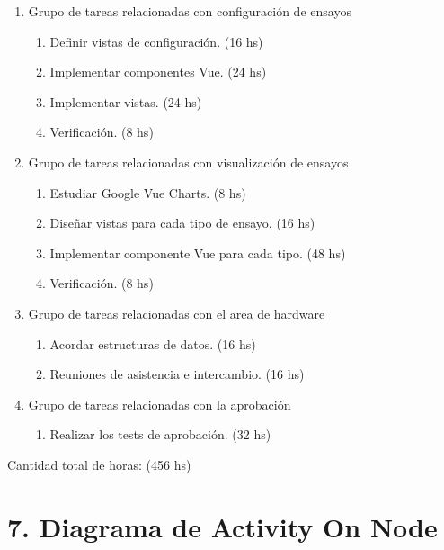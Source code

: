 \documentclass[11pt]{charter}
\begin{document}
\begin{enumerate}
\item Grupo de tareas relacionadas con configuración de ensayos
	\begin{enumerate}
	\item Definir vistas de configuración. (16 hs)
	\item Implementar componentes Vue. (24 hs)
	\item Implementar vistas. (24 hs)
	\item Verificación. (8 hs)
	\end{enumerate}

\item Grupo de tareas relacionadas con visualización de ensayos
	\begin{enumerate}
	\item Estudiar Google Vue Charts. (8 hs)
	\item Diseñar vistas para cada tipo de ensayo. (16 hs)
	\item Implementar componente Vue para cada tipo. (48 hs)
	\item Verificación. (8 hs)
	\end{enumerate}

\item Grupo de tareas relacionadas con el area de hardware
	\begin{enumerate}
	\item Acordar estructuras de datos. (16 hs)
	\item Reuniones de asistencia e intercambio. (16 hs)
	\end{enumerate}

\item Grupo de tareas relacionadas con la aprobación
	\begin{enumerate}
	\item Realizar los tests de aprobación. (32 hs)
	\end{enumerate}

\end{enumerate}

Cantidad total de horas: (456 hs)



\section{7. Diagrama de Activity On Node}
\label{sec:AoN}
\end{document}
